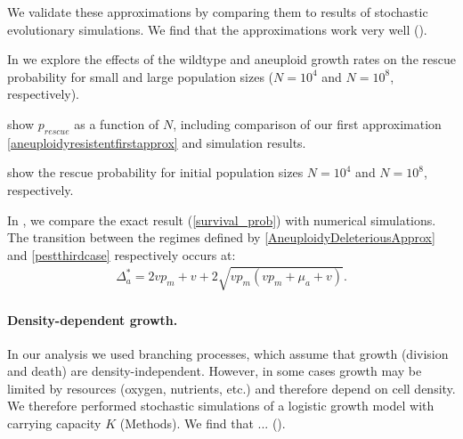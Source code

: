 \documentclass[12pt]{extarticle}
\newcommand{\e}{{\rm e}}
\begin{document}

We validate these approximations by comparing them to results of stochastic evolutionary simulations. We find that the approximations work very well ().

In  we explore the effects of the wildtype and aneuploid growth rates on the rescue probability for small and large population sizes ($N=10^4$ and $N=10^8$, respectively).

 show $p_{rescue}$ as a function of $N$, including comparison of our first approximation \eqref{aneuploidyresistentfirstapprox} and simulation results.

 show the rescue probability for initial population sizes $N=10^4$ and $N=10^8$, respectively. %

In , we compare the exact result (\cref{survival_prob}) with numerical simulations. The transition between the regimes defined by \cref{AneuploidyDeleteriousApprox} and \cref{pestthirdcase} respectively occurs at:
\begin{align}\label{thresholdvalueaneuploid}
\Delta_a^*=2vp_m+v+2\sqrt{vp_m\left(vp_m+\mu_a+v\right)}.
\end{align}


\paragraph*{Density-dependent growth.}

In our analysis we used branching processes, which assume that growth (division and death) are density-independent. However, in some cases growth may be limited by resources (oxygen, nutrients, etc.) and therefore depend on cell density. 
We therefore performed stochastic simulations of a logistic growth model with carrying capacity $K$ (Methods). 
We find that ... (). %
\end{document}
